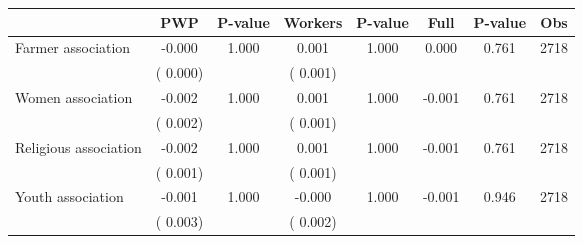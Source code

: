 
\begin{tabular}{l*{7}{c}}\hline&\multicolumn{1}{c}{PWP}&\multicolumn{1}{c}{P-value}&\multicolumn{1}{c}{Workers}&\multicolumn{1}{c}{P-value}&\multicolumn{1}{c}{Full}&\multicolumn{1}{c}{P-value}&\multicolumn{1}{c}{Obs} \\ \hline

 Farmer association       &             -0.000       &        1.000  &              0.001       &        1.000  &              0.000       &              0.761 &  2718 \\ 
                       &       (       0.000)             &                               &       (       0.001)                     &                               &                                               &                                &                      \\ 

 Women association       &             -0.002       &        1.000  &              0.001       &        1.000  &             -0.001       &              0.761 &  2718 \\ 
                       &       (       0.002)             &                               &       (       0.001)                     &                               &                                               &                                &                      \\ 

 Religious association       &             -0.002       &        1.000  &              0.001       &        1.000  &             -0.001       &              0.761 &  2718 \\ 
                       &       (       0.001)             &                               &       (       0.001)                     &                               &                                               &                                &                      \\ 

 Youth association       &             -0.001       &        1.000  &             -0.000       &        1.000  &             -0.001       &              0.946 &  2718 \\ 
                       &       (       0.003)             &                               &       (       0.002)                     &                               &                                               &                                &                      \\ 


\end{tabular}

